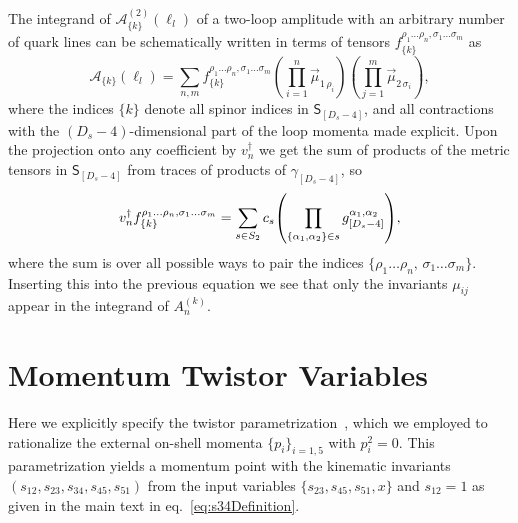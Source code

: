 
The integrand of $\mathcal{A}^{(2)}_{\{k\}}(\ell_l)$ of a two-loop amplitude with an arbitrary
number of quark lines can be schematically written in terms of tensors $f^{\rho_1 \ldots \rho_n, \sigma_1\ldots \sigma_m}_{\{k\}}$ as
\begin{equation} 
  \mathcal{A}_{\{k\}}(\ell_l) = \sum_{n,m} f^{\rho_1 \ldots \rho_n, \sigma_1 \ldots \sigma_m}_{\{k\}}
  \left(\prod_{i=1}^n \vec{\mu}_{1 \, \rho_i}\right)
  \left(\prod_{j=1}^m \vec{\mu}_{2 \, \sigma_i}\right),
\end{equation}
where the indices $\{k\}$ denote all spinor indices in  $\mathsf{S}_{[D_s-4]}$,
and all contractions with the $(D_s-4)$-dimensional part of the loop momenta made explicit.
Upon the projection onto any coefficient by $v_n^\dagger$ we get the sum of products of the metric tensors in $\mathsf{S}_{[D_s-4]}$
from traces of products of $\gamma_{[D_s-4]}$, so 
\begin{equation}
  v_n^\dagger f^{\rho_1 \ldots \rho_n, \sigma_1 \ldots \sigma_m}_{\{k\}}  = \sum_{s\in S_2} c_s \qty(\prod_{\{\alpha_1,\alpha_2\}\in s} g^{\alpha_1,\alpha_2}_{[D_s-4]}),
\end{equation}
where the sum is over all possible ways to pair the indices $\{ \rho_1 \ldots \rho_n,\,\sigma_1 \ldots \sigma_m \}$.
Inserting this into the previous equation we see that only the invariants $\mu_{ij}$ appear in the integrand of $A_n^{(k)}$.



\chapter{Momentum Twistor Variables}
\label{sec:twistors}

Here we explicitly specify the twistor parametrization~\cite{Hodges:2009hk}, which
we employed to rationalize the external on-shell momenta $\{p_i\}_{i=1,5}$ with
$p_i^2=0$. This parametrization yields a momentum point with the
kinematic invariants $(s_{12}, s_{23}, s_{34}, s_{45}, s_{51})$ from the
input variables $\{ s_{23}, s_{45}, s_{51}, x \}$ and $s_{12}=1$ 
as given in the main text in eq.~\eqref{eq:s34Definition}.

